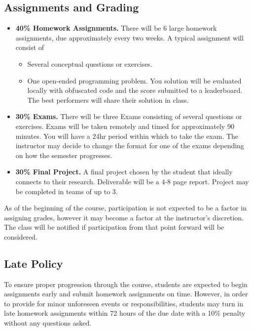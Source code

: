 \documentclass[9pt]{article}
\begin{document}
\begin{samepage}
\section*{Assignments and Grading}

\begin{itemize}[noitemsep]
    \item \textbf{40\% Homework Assignments.}
There will be 6 large homework assignments, due approximately every two weeks. A typical assignment will consist of
\begin{itemize}[nosep]
    \item Several conceptual questions or exercises.
    \item One open-ended programming problem. You solution will be evaluated locally with obfuscated code and the score submitted to a leaderboard. The best performers will share their solution in class.
\end{itemize}

\item \textbf{30\% Exams.}
There will be three Exams consisting of several questions or exercises. Exams will be taken remotely and timed for approximately 90 minutes. You will have a 24hr period within which to take the exam. The instructor may decide to change the format for one of the exams depending on how the semester progresses.

\item \textbf{30\% Final Project.}
A final project chosen by the student that ideally connects to their research. Deliverable will be a 4-8 page report. Project may be completed in teams of up to 3.
\end{itemize}
As of the beginning of the course, participation is not expected to be a factor in assigning grades, however it may become a factor at the instructor's discretion. The class will be notified if participation from that point forward will be considered.
\end{samepage}

\subsection*{Late Policy}

To ensure proper progression through the course, students are expected to begin assignments early and submit homework assignments on time. However, in order to provide for minor unforeseen events or responsibilities, students may turn in late homework assignments within 72 hours of the due date with a 10\% penalty without any questions asked.
\end{document}
